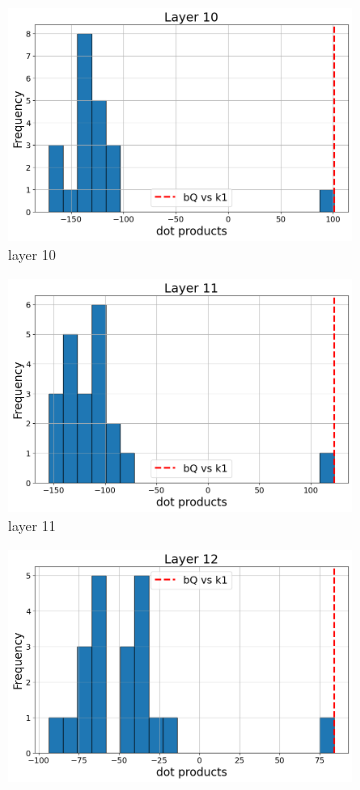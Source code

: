 \documentclass[11pt]{article}
\begin{document}
\begin{figure}[t]
    \begin{subfigure}[t]{0.24\textwidth}
    \centering
    \includegraphics[width=1.4\columnwidth]{figures/obs1_appendix/obs1_layer10.png}
    \caption{layer 10}
  \end{subfigure}\hfill
    \begin{subfigure}[t]{0.24\textwidth}
    \centering
    \includegraphics[width=1.4\columnwidth]{figures/obs1_appendix/obs1_layer11.png}
    \caption{layer 11}
  \end{subfigure}\hfill
  \begin{subfigure}[t]{0.24\textwidth}
    \centering
    \includegraphics[width=1.4\columnwidth]{figures/obs1_appendix/obs1_layer12.png}

\end{subfigure}
\end{figure}
\end{document}
